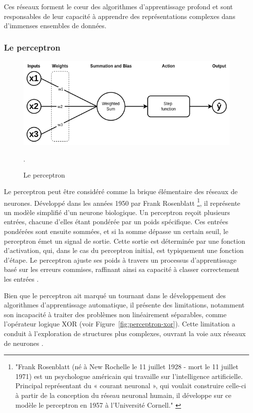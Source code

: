 Ces réseaux forment le cœur des algorithmes d'apprentissage profond et sont responsables de leur capacité à apprendre des représentations complexes dans d'immenses ensembles de données. 

\subsubsection{Le perceptron}

\begin{figure}[H]
    \centering
    \includegraphics[width=12cm]{gfx/fig-perceptron.png}
    \caption{Le perceptron}.
    \label{fig:perceptron}
\end{figure}

Le perceptron peut être considéré comme la brique élémentaire des réseaux de neurones. Développé dans les années 1950 par Frank Rosenblatt \footnote{"Frank Rosenblatt (né à New Rochelle le 11 juillet 1928 - mort le 11 juillet 1971) est un psychologue américain qui travaille sur l'intelligence artificielle. Principal représentant du « courant neuronal », qui voulait construire celle-ci à partir de la conception du réseau neuronal humain, il développe sur ce modèle le perceptron en 1957 à l'Université Cornell." \cite{frwiki:213039317}}, il représente un modèle simplifié d'un neurone biologique. Un perceptron reçoit plusieurs entrées, chacune d'elles étant pondérée par un poids spécifique. Ces entrées pondérées sont ensuite sommées, et si la somme dépasse un certain seuil, le perceptron émet un signal de sortie. Cette sortie est déterminée par une fonction d'activation, qui, dans le cas du perceptron initial, est typiquement une fonction d'étape. Le perceptron ajuste ses poids à travers un processus d'apprentissage basé sur les erreurs commises, raffinant ainsi sa capacité à classer correctement les entrées \cite{wang2017origin}.

Bien que le perceptron ait marqué un tournant dans le développement des algorithmes d'apprentissage automatique, il présente des limitations, notamment son incapacité à traiter des problèmes non linéairement séparables, comme l'opérateur logique XOR (voir Figure~\ref{fig:perceptron-xor}). Cette limitation a conduit à l'exploration de structures plus complexes, ouvrant la voie aux réseaux de neurones  \cite{Min69}.

